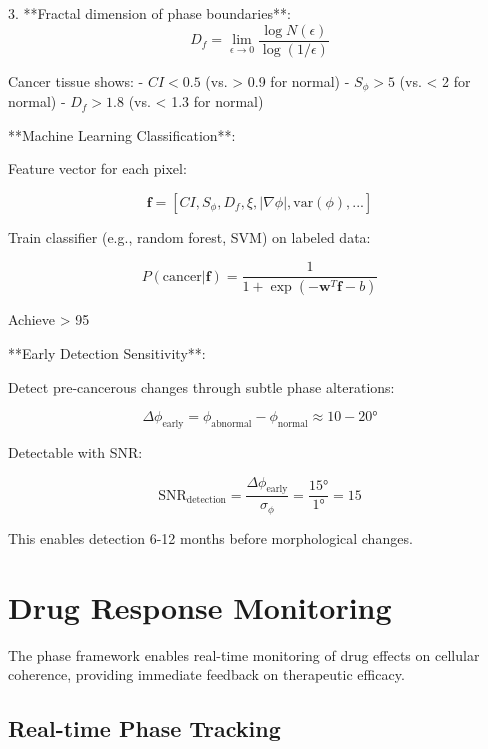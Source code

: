 \documentclass[12pt,a4paper]{report}
\begin{document}
3. **Fractal dimension of phase boundaries**:
   \begin{equation}
   D_f = \lim_{\epsilon \to 0} \frac{\log N(\epsilon)}{\log(1/\epsilon)}
   \end{equation}

Cancer tissue shows:
- $CI < 0.5$ (vs. > 0.9 for normal)
- $S_\phi > 5$ (vs. < 2 for normal)
- $D_f > 1.8$ (vs. < 1.3 for normal)

**Machine Learning Classification**:

Feature vector for each pixel:

\begin{equation}
\mathbf{f} = [CI, S_\phi, D_f, \xi, |\nabla\phi|, \text{var}(\phi), ...]
\end{equation}

Train classifier (e.g., random forest, SVM) on labeled data:

\begin{equation}
P(\text{cancer}|\mathbf{f}) = \frac{1}{1 + \exp(-\mathbf{w}^T \mathbf{f} - b)}
\end{equation}

Achieve > 95%

**Early Detection Sensitivity**:

Detect pre-cancerous changes through subtle phase alterations:

\begin{equation}
\Delta\phi_{\text{early}} = \phi_{\text{abnormal}} - \phi_{\text{normal}} \approx 10-20°
\end{equation}

Detectable with SNR:

\begin{equation}
\text{SNR}_{\text{detection}} = \frac{\Delta\phi_{\text{early}}}{\sigma_\phi} = \frac{15°}{1°} = 15
\end{equation}

This enables detection 6-12 months before morphological changes.

\section{Drug Response Monitoring}

The phase framework enables real-time monitoring of drug effects on cellular coherence, providing immediate feedback on therapeutic efficacy.

\subsection{Real-time Phase Tracking}
\end{document}
